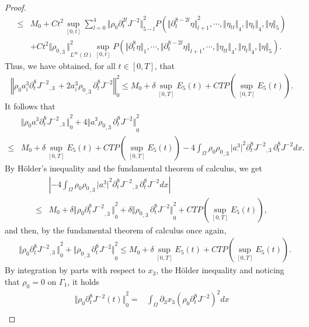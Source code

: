 \documentclass[12pt,twoside,reqno]{amsart}
\numberwithin{equation}{section}
\theoremstyle{definition}
\theoremstyle{remark}
\begin{document}
\begin{proof}
\begin{align*}
  {\leqslant}&M_0+Ct^2 \sup_{[0,t]}\sum_{l=0}^4{\Vert{{\rho_0}  {\partial}_t^{2l}J^{-2}}\Vert}_{5-l}^2  P({\Vert{{\partial}_t^{8-2l}\eta}\Vert}_{l+1}^2,\cdots,{\Vert{\eta_{tt}}\Vert}_4, {\Vert{\eta_t}\Vert}_4,{\Vert{\eta}\Vert}_5)\\
  &+Ct^2{\Vert{{{\rho_0}_{,{3}}\,}}\Vert}_{L^\infty(\Omega)}^2 \sup_{[0,t]}P({\Vert{{\partial}_t^{8}\eta}\Vert}_{1},\cdots,{\Vert{{\partial}_t^{8-2l}\eta}\Vert}_{l+1},\cdots, {\Vert{\eta_{tt}}\Vert}_4, {\Vert{\eta_t}\Vert}_4,{\Vert{\eta}\Vert}_5).
\end{align*}
Thus, we have obtained, for all $t\in [0,T]$, that
\begin{align*}
  {\left\Vert{{\rho_0}  a_i^3 {\partial}_t^8{{{J^{-2}}}_{,{3}}\,}+2 a_i^3{{\rho_0}_{,{3}}\,} {\partial}_t^8 J^{-2}}\right\Vert}_0^2{\leqslant} M_0+\delta \sup_{[0,T]} E_5(t)+CTP(\sup_{[0,T]}E_5(t)).
\end{align*}
It follows that
\begin{align*}
  &{\Vert{{\rho_0}  a_\cdot^3 {\partial}_t^8{{{J^{-2}}}_{,{3}}\,}}\Vert}_0^2+4{\Vert{ a_\cdot^3{{\rho_0}_{,{3}}\,} {\partial}_t^8 J^{-2}}\Vert}_0^2\\
  {\leqslant}& M_0+\delta \sup_{[0,T]} E_5(t)+CTP(\sup_{[0,T]}E_5(t))-4\int_\Omega {\rho_0}{{\rho_0}_{,{3}}\,} {\vert{a_\cdot^3}\vert}^2 {\partial}_t^8{{{J^{-2}}}_{,{3}}\,} {\partial}_t^8 J^{-2} dx.
\end{align*}
By H\"older's inequality and the fundamental theorem of calculus, we get
\begin{align*}
  &{\left\vert{-4\int_\Omega {\rho_0} {{\rho_0}_{,{3}}\,} {\vert{a_\cdot^3}\vert}^2 {\partial}_t^8{{{J^{-2}}}_{,{3}}\,} {\partial}_t^8 J^{-2} dx}\right\vert}\\
  {\leqslant}& M_0+\delta {\Vert{{\rho_0} {{{{\partial}_t^8 J^{-2}}}_{,{3}}\,}}\Vert}_0^2+\delta {\Vert{{{\rho_0}_{,{3}}\,}{\partial}_t^8 J^{-2}}\Vert}_0^2+CTP(\sup_{[0,T]}E_5(t)),
\end{align*}
and then, by the fundamental theorem of calculus once again,
\begin{align*}
  &{\Vert{{\rho_0}   {\partial}_t^8{{{J^{-2}}}_{,{3}}\,}}\Vert}_0^2+{\Vert{ {{\rho_0}_{,{3}}\,} {\partial}_t^8 J^{-2}}\Vert}_0^2
  {\leqslant} M_0+\delta \sup_{[0,T]} E_5(t)+CTP(\sup_{[0,T]}E_5(t)).
\end{align*}
By integration by parts with respect to $x_3$, the H\"older inequality and noticing that ${\rho_0}=0$ on $\Gamma_1$, it holds
\begin{align*}
{\Vert{{\rho_0}  {\partial}_t^8J^{-2}(t)}\Vert}_0^2=&\int_\Omega {\partial}_{3}x_3 ({\rho_0}  {\partial}_t^8J^{-2})^2dx\\

\end{align*}
\end{proof}
\end{document}
